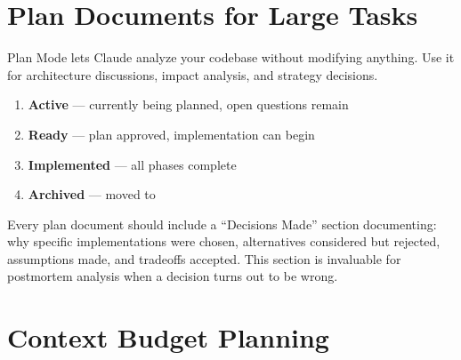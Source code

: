 
\section{Plan Documents for Large Tasks}
\label{sec:plans}



Plan Mode lets Claude analyze your codebase without modifying anything.
Use it for architecture discussions, impact analysis, and strategy decisions.


\begin{enumerate}
  \item \textbf{Active} --- currently being planned, open questions remain
  \item \textbf{Ready} --- plan approved, implementation can begin
  \item \textbf{Implemented} --- all phases complete
  \item \textbf{Archived} --- moved to 
\end{enumerate}

Every plan document should include a ``Decisions Made'' section
documenting: why specific implementations were chosen,
alternatives considered but rejected, assumptions made,
and tradeoffs accepted. This section is invaluable for postmortem analysis
when a decision turns out to be wrong.


\section{Context Budget Planning}
\label{sec:context-budget}

